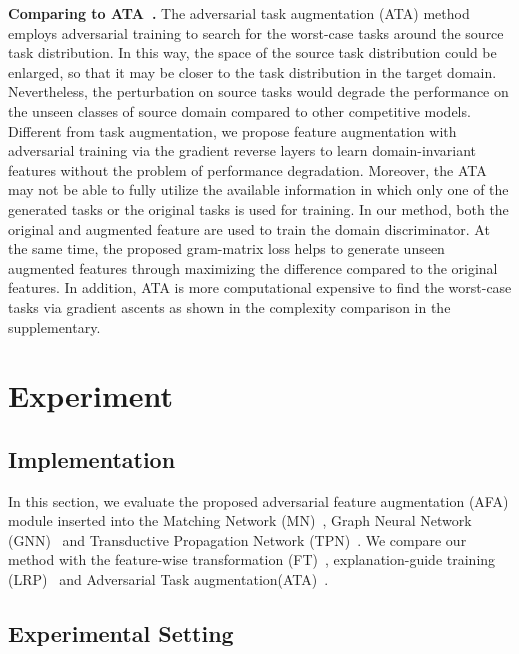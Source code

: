 \documentclass[runningheads]{utils/llncs}
\begin{document}
\textbf{Comparing to ATA~\cite{WangD21}.} 
The adversarial task augmentation (ATA) method employs  adversarial training to search for the worst-case tasks around the source task distribution.
In this way, the space of the source task distribution could be enlarged, so that it may be closer to the task distribution in the target domain. 
Nevertheless, the perturbation on source tasks would degrade the performance on the unseen classes of source domain compared to other competitive models. 
Different from task augmentation, we propose feature augmentation with adversarial training via the gradient reverse layers to learn domain-invariant features without the problem of performance degradation.
Moreover, the ATA may not be able to fully utilize the available information in which only one of the generated tasks or the original tasks is used for training. 
In our method, both the original and augmented feature are used to train the domain discriminator.
At the same time, the proposed gram-matrix loss helps to generate unseen augmented features through maximizing the difference compared to the original features. 
In addition, ATA is more computational expensive to find the worst-case tasks via gradient ascents as shown in the complexity comparison in the supplementary.












 \section{Experiment}
\subsection{Implementation}
In this section, we evaluate the proposed adversarial feature augmentation (AFA) module inserted into the Matching Network (MN)~\cite{NIPS2016_90e13578}, Graph Neural Network (GNN)~\cite{SatorrasE18} and Transductive Propagation Network (TPN)~\cite{LiuLPKYHY19}. 
We compare our method with the feature-wise transformation (FT)~\cite{TsengLH020}, explanation-guide training (LRP)~\cite{SunLSZCB20} and Adversarial Task augmentation(ATA)~\cite{WangD21}.







\subsection{Experimental Setting}
\label{data}
\end{document}
